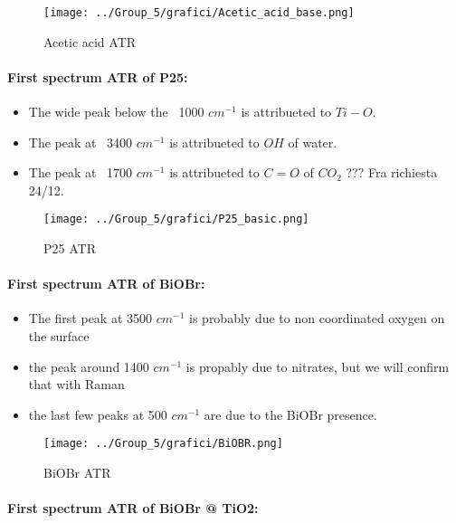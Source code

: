 \begin{figure}[ht]
    \centering
    \texttt{[image: ../Group\_5/grafici/Acetic\_acid\_base.png]}
    \caption{Acetic acid ATR}
\end{figure}

\newpage
\paragraph{First spectrum ATR of P25:}

\begin{itemize}
    \item The wide peak below the ~1000 $cm^{-1}$ is attribueted to $Ti-O$.
    \item The peak at ~3400 $cm^{-1}$ is attribueted to $OH$ of water.
    \item The peak at ~1700 $cm^{-1}$ is attribueted to $C=O$ of $CO_2$ ??? Fra richiesta 24/12.
\end{itemize}

\begin{figure}[ht]
    \centering
    \texttt{[image: ../Group\_5/grafici/P25\_basic.png]}
    \caption{P25 ATR}
\end{figure}

\newpage
\paragraph{First spectrum ATR of BiOBr:}

\begin{itemize}
    \item The first peak at 3500 $cm^{-1}$ is probably due to non coordinated oxygen on the surface
    \item the peak around 1400 $cm^{-1}$ is propably due to nitrates, but we will confirm that with Raman
    \item the last few peaks at 500 $cm^{-1}$ are due to the BiOBr presence.
\end{itemize}

\begin{figure}[ht]
    \centering
    \texttt{[image: ../Group\_5/grafici/BiOBR.png]}
    \caption{BiOBr ATR}
\end{figure}

\newpage
\paragraph{First spectrum ATR of BiOBr @ TiO2:}

